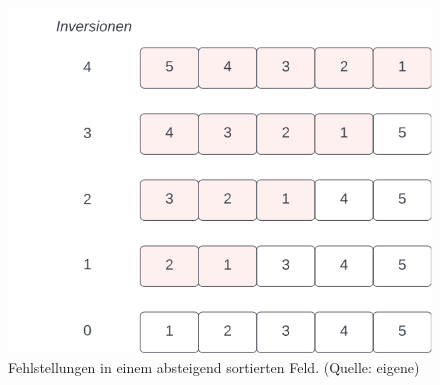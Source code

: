 \begin{figure}
    \begin{center}
        \includegraphics[scale=0.5]{chapters/Sortierverfahren/img/inversions}
        \caption{Fehlstellungen in einem absteigend sortierten Feld. (Quelle: eigene)}
        \label{fig:inversions}
    \end{center}
\end{figure}
